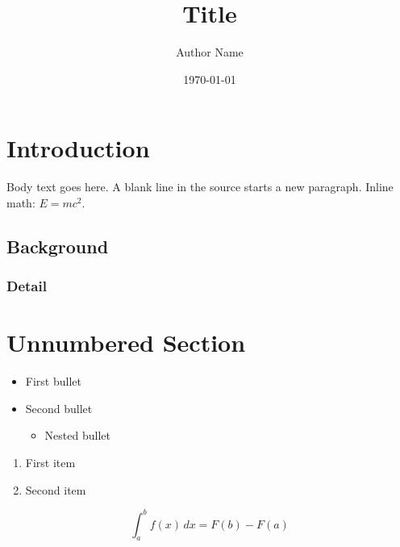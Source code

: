 \documentclass[12pt, a4paper]{article}   %
\title{Title}
\author{Author Name}
\date{\today}           %
\begin{document}
\maketitle              %
\tableofcontents        %
\newpage


\section{Introduction}

Body text goes here. A blank line in the source starts a new paragraph.
Inline math: $E = mc^2$.

\subsection{Background}

\subsubsection{Detail}

\section*{Unnumbered Section}


\begin{itemize}
    \item First bullet
    \item Second bullet
        \begin{itemize}
            \item Nested bullet
        \end{itemize}
\end{itemize}

\begin{enumerate}
    \item First item
    \item Second item
\end{enumerate}


\begin{equation}
    \int_a^b f(x)\,dx = F(b) - F(a)
    \label{eq:fundamental}
\end{equation}
\end{document}
